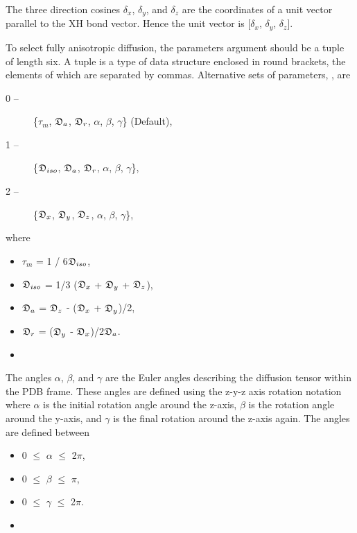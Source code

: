  The three direction cosines $\delta_x$, $\delta_y$, and $\delta_z$ are the coordinates of a unit vector parallel to the XH bond vector.  Hence the unit vector is [$\delta_x$, $\delta_y$, $\delta_z$]. 
  

 To select fully anisotropic diffusion, the parameters argument should be a tuple of length six.  A tuple is a type of data structure enclosed in round brackets, the elements of which are separated by commas.  Alternative sets of parameters, , are 
  

 \begin{description} 
 \item[0 --]  \{$\tau_m$, $\mathfrak{D}_a$, $\mathfrak{D}_r$, $\alpha$, $\beta$, $\gamma$\}   (Default),  
 \item[1 --]  \{$\mathfrak{D}_{iso}$, $\mathfrak{D}_a$, $\mathfrak{D}_r$, $\alpha$, $\beta$, $\gamma$\},  
 \item[2 --]  \{$\mathfrak{D}_x$, $\mathfrak{D}_y$, $\mathfrak{D}_z$, $\alpha$, $\beta$, $\gamma$\},  
 \end{description} 
  

 where 
  

 \begin{itemize} 
 \item[] $\tau_m$ = 1 / 6$\mathfrak{D}_{iso}$,  
 \item[] $\mathfrak{D}_{iso}$ = 1/3 ($\mathfrak{D}_x$ + $\mathfrak{D}_y$ + $\mathfrak{D}_z$),  
 \item[] $\mathfrak{D}_a$ = $\mathfrak{D}_z$ - ($\mathfrak{D}_x$ + $\mathfrak{D}_y$)/2,  
 \item[] $\mathfrak{D}_r$ = ($\mathfrak{D}_y$ - $\mathfrak{D}_x$)/2$\mathfrak{D}_a$.  
 \item[]  
 \end{itemize} 
  

 The angles $\alpha$, $\beta$, and $\gamma$ are the Euler angles describing the diffusion tensor within the PDB frame.  These angles are defined using the z-y-z axis rotation notation where $\alpha$ is the initial rotation angle around the z-axis, $\beta$ is the rotation angle around the y-axis, and $\gamma$ is the final rotation around the z-axis again.  The angles are defined between 
  

 \begin{itemize} 
 \item[] 0 $\le$ $\alpha$ $\le$ 2$\pi$,  
 \item[] 0 $\le$ $\beta$ $\le$ $\pi$,  
 \item[] 0 $\le$ $\gamma$ $\le$ 2$\pi$.  
 \item[]  
 \end{itemize} 
  

